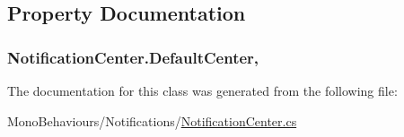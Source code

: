 \subsection{Property Documentation}
\subsubsection[{\texorpdfstring{Default\+Center}{DefaultCenter}}]{ Notification\+Center.\+Default\+Center\hspace{0.3cm}{\ttfamily [static]}, {\ttfamily [get]}}\hypertarget{class_notification_center_a071abaa07d2de388029551de242d405b}{}\label{class_notification_center_a071abaa07d2de388029551de242d405b}


The documentation for this class was generated from the following file\+:\begin{DoxyCompactItemize}
\item 
Mono\+Behaviours/\+Notifications/\hyperlink{_notification_center_8cs}{Notification\+Center.\+cs}\end{DoxyCompactItemize}
